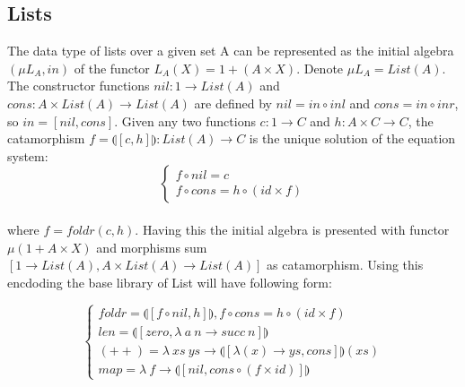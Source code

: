 \documentclass[11pt,oneside]{article}
\begin{document}
  \subsection{Lists}
  The data type of lists over a given set A can be represented as the initial algebra
  $(\mu L_A, in)$ of the functor $L_A(X) = 1 + (A \times X)$. Denote $\mu L_A = List(A)$.
  The constructor functions $nil: 1 \rightarrow List(A)$ and
  $cons: A \times List(A) \rightarrow List(A)$ are defined by
  $nil = in \circ inl$ and $cons = in \circ inr$, so $in = [nil,cons]$.
  Given any two functions $c: 1 \rightarrow C$ and $h: A \times C \rightarrow C$,
  the catamorphism $f = \llparenthesis [c,h] \rrparenthesis : List(A) \rightarrow C$
  is the unique solution of the equation system:
\vspace{0.3cm}
$$
\begin{cases}
  f \circ nil  = c \\
  f \circ cons = h \circ (id \times f)
\end{cases}
$$

\paragraph{}
  where $f = foldr(c,h)$. Having this the initial algebra is presented with functor
  $\mu (1 + A \times X)$ and morphisms sum $[1 \rightarrow List(A), A \times List(A) \rightarrow List(A)]$
  as catamorphism. Using this encdoding the base library of List will have following form:

\vspace{0.5cm}
$$
\begin{cases}
 foldr = \llparenthesis [ f \circ nil , h] \rrparenthesis, f \circ cons = h \circ (id \times f)\\
 len = \llparenthesis [ zero, \lambda\ a\ n \rightarrow succ\ n ] \rrparenthesis \\
 (++) = \lambda\ xs\ ys \rightarrow \llparenthesis [ \lambda (x) \rightarrow ys, cons ] \rrparenthesis (xs) \\
 map = \lambda\ f \rightarrow \llparenthesis [ nil, cons \circ (f \times id)] \rrparenthesis
\end{cases}
$$
\end{document}
